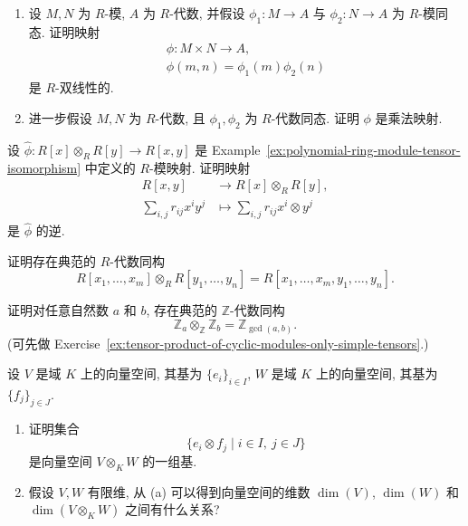 \BookExerciseHeading
\begin{BookExercises}
  \item\label{ex:product-of-linear-maps-bilinear-and-multiplicative}
  \begin{enumerate}
    \item 设 $M,N$ 为 $R$-模, $A$ 为 $R$-代数, 并假设 $\phi_{1}:M\to A$ 与 $\phi_{2}:N\to A$ 为 $R$-模同态. 证明映射
    \[
      \begin{gathered}
        \phi:M\times N\to A,\\
        \phi(m,n)=\phi_{1}(m)\phi_{2}(n)
      \end{gathered}
    \]
    是 $R$-双线性的.
    \item 进一步假设 $M,N$ 为 $R$-代数, 且 $\phi_{1},\phi_{2}$ 为 $R$-代数同态. 证明 $\phi$ 是乘法映射.
  \end{enumerate}
  \item\label{ex:inverse-of-polynomial-ring-module-tensor-map} 设 $\widehat{\phi}:R[x]\otimes_{R}R[y]\to R[x,y]$ 是 Example~\ref{ex:polynomial-ring-module-tensor-isomorphism} 中定义的 $R$-模映射. 证明映射
  \[
    \begin{aligned}
      R[x,y]&\to R[x]\otimes_{R}R[y],\\
      \sum_{i,j}r_{ij}x^{i}y^{j}&\mapsto\sum_{i,j}r_{ij}x^{i}\otimes y^{j}
    \end{aligned}
  \]
  是 $\widehat{\phi}$ 的逆.
  \item\label{ex:tensor-isomorphism-of-multivariate-polynomial-rings} 证明存在典范的 $R$-代数同构
  \[
    R[x_{1},\ldots,x_{m}]\otimes_{R}R[y_{1},\ldots,y_{n}]
      =R[x_{1},\ldots,x_{m},y_{1},\ldots,y_{n}].
  \]
  \item\label{ex:cyclic-tensor-product-gcd} 证明对任意自然数 $a$ 和 $b$, 存在典范的 $\mathbb{Z}$-代数同构
  \[
    \mathbb{Z}_{a}\otimes_{\mathbb{Z}}\mathbb{Z}_{b}=\mathbb{Z}_{\gcd(a,b)}.
  \]
  (可先做 Exercise~\ref{ex:tensor-product-of-cyclic-modules-only-simple-tensors}.)
  \item\label{ex:tensor-product-basis-from-factor-bases} 设 $V$ 是域 $K$ 上的向量空间, 其基为 $\{e_{i}\}_{i\in I}$, $W$ 是域 $K$ 上的向量空间, 其基为 $\{f_{j}\}_{j\in J}$.
  \begin{enumerate}
    \item 证明集合
    \[
      \{e_{i}\otimes f_{j}\mid i\in I,\ j\in J\}
    \]
    是向量空间 $V\otimes_{K}W$ 的一组基.
    \item 假设 $V,W$ 有限维, 从 (a) 可以得到向量空间的维数 $\dim(V)$, $\dim(W)$ 和 $\dim(V\otimes_{K}W)$ 之间有什么关系?

\end{enumerate}
\end{BookExercises}
